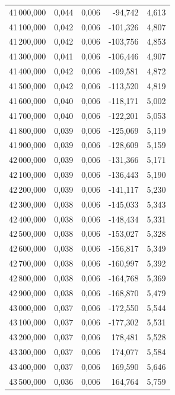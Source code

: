 \begin{longtable}{rrrrr}
41\,000,000 & 0,044 & 0,006 & -94,742 & 4,613\\
41\,100,000 & 0,042 & 0,006 & -101,326 & 4,807\\
41\,200,000 & 0,042 & 0,006 & -103,756 & 4,853\\
41\,300,000 & 0,041 & 0,006 & -106,446 & 4,907\\
41\,400,000 & 0,042 & 0,006 & -109,581 & 4,872\\
41\,500,000 & 0,042 & 0,006 & -113,520 & 4,819\\
41\,600,000 & 0,040 & 0,006 & -118,171 & 5,002\\
41\,700,000 & 0,040 & 0,006 & -122,201 & 5,053\\
41\,800,000 & 0,039 & 0,006 & -125,069 & 5,119\\
41\,900,000 & 0,039 & 0,006 & -128,609 & 5,159\\
42\,000,000 & 0,039 & 0,006 & -131,366 & 5,171\\
42\,100,000 & 0,039 & 0,006 & -136,443 & 5,190\\
42\,200,000 & 0,039 & 0,006 & -141,117 & 5,230\\
42\,300,000 & 0,038 & 0,006 & -145,033 & 5,343\\
42\,400,000 & 0,038 & 0,006 & -148,434 & 5,331\\
42\,500,000 & 0,038 & 0,006 & -153,027 & 5,328\\
42\,600,000 & 0,038 & 0,006 & -156,817 & 5,349\\
42\,700,000 & 0,038 & 0,006 & -160,997 & 5,392\\
42\,800,000 & 0,038 & 0,006 & -164,768 & 5,369\\
42\,900,000 & 0,038 & 0,006 & -168,870 & 5,479\\
43\,000,000 & 0,037 & 0,006 & -172,550 & 5,544\\
43\,100,000 & 0,037 & 0,006 & -177,302 & 5,531\\
43\,200,000 & 0,037 & 0,006 & 178,481 & 5,528\\
43\,300,000 & 0,037 & 0,006 & 174,077 & 5,584\\
43\,400,000 & 0,037 & 0,006 & 169,590 & 5,646\\
43\,500,000 & 0,036 & 0,006 & 164,764 & 5,759\\
\end{longtable}
